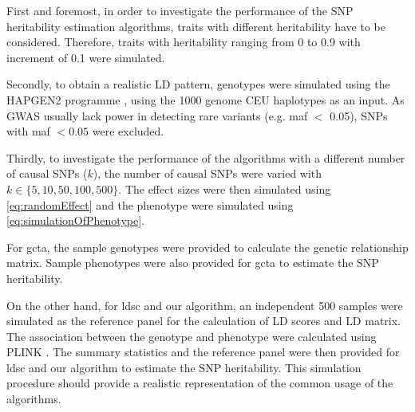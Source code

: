 			First and foremost, in order to investigate the performance of the \gls{SNP} heritability estimation algorithms, traits with different heritability have to be considered.
			Therefore, traits with heritability ranging from 0 to 0.9 with increment of 0.1 were simulated. 
		

			Secondly, to obtain a realistic \gls{LD} pattern, genotypes were simulated using the HAPGEN2 programme \citep{Su2011}, using the 1000 genome \gls{CEU} haplotypes as an input.
			As \gls{GWAS} usually lack power in detecting rare variants (e.g. \gls{maf} $<$ 0.05), \glspl{SNP} with \gls{maf} $<0.05$ were excluded.
			
			Thirdly, to investigate the performance of the algorithms with a different number of causal \glspl{SNP} ($k$), the number of causal \glspl{SNP} were varied with $k\in\{5, 10, 50, 100, 500\}$.
			The effect sizes were then simulated using \cref{eq:randomEffect} and the phenotype were simulated using \cref{eq:simulationOfPhenotype}.
			
			For \gls{gcta}, the sample genotypes were provided to calculate the genetic relationship matrix. 
			Sample phenotypes were also provided for \gls{gcta} to estimate the \gls{SNP} heritability.
			
			On the other hand, for \gls{ldsc} and our algorithm, an independent 500 samples were simulated as the reference panel for the calculation of \gls{LD} scores and \gls{LD} matrix. 
			The association between the genotype and phenotype were calculated using PLINK \citep{Purcell2007}.
			The summary statistics and the reference panel were then provided for \gls{ldsc} and our algorithm to estimate the \gls{SNP} heritability.
			This simulation procedure should provide a realistic representation of the common usage of the algorithms.
			
